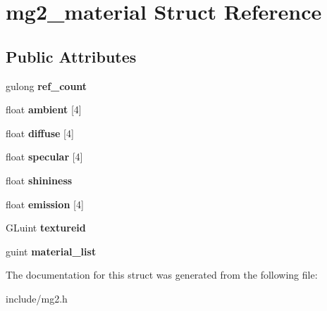 \hypertarget{structmg2__material}{}\section{mg2\+\_\+material Struct Reference}
\label{structmg2__material}
\subsection*{Public Attributes}
\begin{DoxyCompactItemize}
\item 
\mbox{\label{structmg2__material_a3a3c5275b02d07dc34aec02fc9f9d5ca}} 
gulong {\bfseries ref\+\_\+count}
\item 
\mbox{\label{structmg2__material_a77c1d7656583d004e9fd67fc291c8b0c}} 
float {\bfseries ambient} \mbox{[}4\mbox{]}
\item 
\mbox{\label{structmg2__material_a627b9e332c960ed7845881420a5d5811}} 
float {\bfseries diffuse} \mbox{[}4\mbox{]}
\item 
\mbox{\label{structmg2__material_a79601f83d3341cea3608c08bf5db4aa8}} 
float {\bfseries specular} \mbox{[}4\mbox{]}
\item 
\mbox{\label{structmg2__material_a10466fcd31fc382de388a2d4b0046603}} 
float {\bfseries shininess}
\item 
\mbox{\label{structmg2__material_a43c300b9ed72d5c7d0417abd962aa90c}} 
float {\bfseries emission} \mbox{[}4\mbox{]}
\item 
\mbox{\label{structmg2__material_aba5ac031bce0a3ae0e45c4d892e61af9}} 
G\+Luint {\bfseries textureid}
\item 
\mbox{\label{structmg2__material_a594b57d523ae2020f7fa322cf4b7c6dc}} 
guint {\bfseries material\+\_\+list}
\end{DoxyCompactItemize}


The documentation for this struct was generated from the following file\+:\begin{DoxyCompactItemize}
\item 
include/mg2.\+h\end{DoxyCompactItemize}
